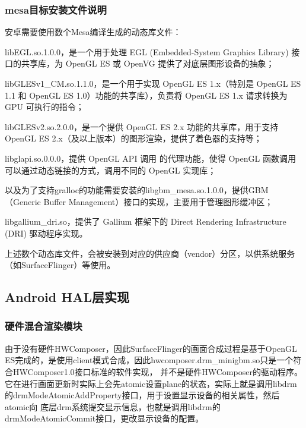 \subsubsection{mesa目标安装文件说明}

安卓需要使用数个Mesa编译生成的动态库文件：

libEGL.so.1.0.0，是一个用于处理 EGL (Embedded-System Graphics Library) 接口的共享库，为 OpenGL ES 或 OpenVG 提供了对底层图形设备的抽象；

libGLESv1\_CM.so.1.1.0，是一个用于实现 OpenGL ES 1.x（特别是 OpenGL ES 1.1 和 OpenGL ES 1.0）功能的共享库），负责将 OpenGL ES 1.x 请求转换为 GPU 可执行的指令；

libGLESv2.so.2.0.0，是一个提供 OpenGL ES 2.x 功能的共享库，用于支持 OpenGL ES 2.x（及以上版本）的图形渲染，提供了着色器的支持等；

libglapi.so.0.0.0，提供 OpenGL API 调用 的代理功能，使得 OpenGL 函数调用可以通过动态链接的方式，调用不同的 OpenGL 实现库；

以及为了支持gralloc的功能需要安装的libgbm\_mesa.so.1.0.0，提供GBM（Generic Buffer Management）接口的实现，主要用于管理图形缓冲区；

libgallium\_dri.so，提供了 Gallium 框架下的 Direct Rendering Infrastructure (DRI) 驱动程序实现。

上述数个动态库文件，会被安装到对应的供应商（vendor）分区，以供系统服务（如SurfaceFlinger）等使用。

\subsection{Android HAL层实现}

\subsubsection{硬件混合渲染模块}
由于没有硬件HWComposer，因此SurfaceFlinger的画面合成过程是基于OpenGL ES完成的，是使用client模式合成，因此hwcomposer.drm\_minigbm.so只是一个符合HWComposer1.0接口标准的软件实现，
并不是硬件HWComposer的驱动程序。它在进行画面更新时实际上会先atomic设置plane的状态，实际上就是调用libdrm的drmModeAtomicAddProperty接口，用于设置显示设备的相关属性，然后atomic向
底层drm系统提交显示信息，也就是调用libdrm的drmModeAtomicCommit接口，更改显示设备的配置。

